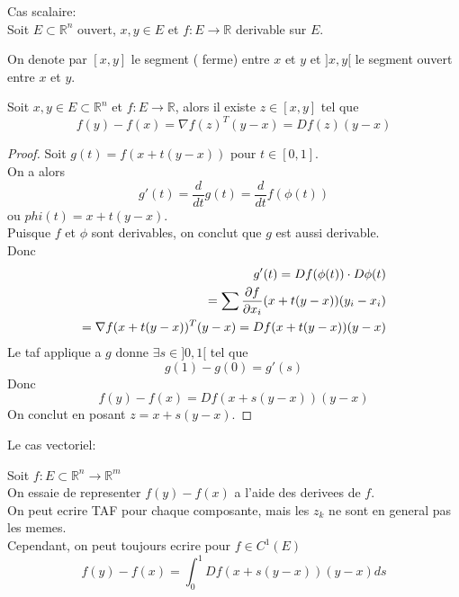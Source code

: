 \documentclass[../main.tex]{subfiles}
\begin{document}
	Cas scalaire:\\
	Soit $E \subset \mathbb{R}^n$ ouvert, $x,y \in E$ et $f : E \to \mathbb{R}$ derivable sur $E$.\\
\begin{figure}[H]
    \centering
\end{figure}
On denote par $[x,y]$ le segment ( ferme)  entre $x$ et $y$ et $]x,y[$ le segment ouvert entre $x$ et $y$.
\begin{thm}
	Soit $x,y\in E\subset \mathbb{R}^n$ et $f: E\to \mathbb{R}$, alors il existe $z \in [ x,y] $ tel que
	\[ 
		f( y) -f( x) = \nabla f( z) ^{T} ( y-x)  = Df( z) ( y-x) 
	\]
\end{thm}
\begin{proof}
	Soit $g( t) = f( x + t ( y-x) ) $ pour $t \in [ 0,1] $.\\
	On a alors
	\[ 
		g'( t) = \frac{d}{dt}g( t) = \frac{d}{dt} f( \phi( t) ) 
	\]
	ou $phi( t) = x + t( y-x) $.\\
	Puisque $f$ et $\phi$ sont derivables, on conclut que $g$ est aussi derivable.\\
	Donc
	\begin{align*}
		g'( t) = Df( \phi( t) ) \cdot D \phi( t)\\
		= \sum \frac{\partial f}{\partial x_i}( x + t( y-x) ) ( y_i -x_i)\\
		=\nabla f( x + t( y-x) )^{T}( y-x)  = Df( x + t( y-x) ) ( y-x) 
	\end{align*}
	Le taf applique a $g$ donne $\exists s \in  ] 0,1[ $	tel que
	\[ 
		g( 1) - g( 0) = g'( s) 
	\]
Donc
\[ 
	f( y) - f( x)  = Df ( x + s( y-x) ) ( y-x) 
\]
On conclut en posant $z= x+ s( y-x) $.

\end{proof}
Le cas vectoriel:
\begin{thm}
	Soit $f: E \subset \mathbb{R}^n \to \mathbb{R}^m$ \\
	On essaie de representer $f( y) - f( x) $ a l'aide des derivees de $f$.\\
	On peut ecrire TAF pour chaque composante, mais les $z_k$ ne sont en general pas les memes.\\
	Cependant, on peut toujours ecrire pour $f \in C^{1}( E)  $
	\[ 
		f( y) - f( x) = \int_{ 0 }^{ 1 } Df( x+ s( y-x) )( y-x) ds
	\]
	
\end{thm}
\end{document}
